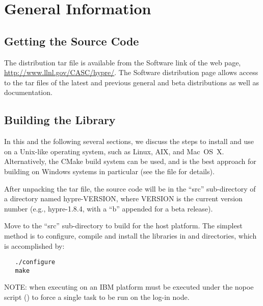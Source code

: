 
\chapter{General Information}


\section{Getting the Source Code}

The \hypre{} distribution tar file is available from the Software link of the
\hypre{} web page, \url{http://www.llnl.gov/CASC/hypre/}.  The \hypre{} Software
distribution page allows access to the tar files of the latest and previous
general and beta distributions as well as documentation.


\section{Building the Library}

In this and the following several sections, we discuss the steps to install and
use \hypre{} on a Unix-like operating system, such as Linux, AIX, and Mac~OS~X.
Alternatively, the CMake build system \cite{CMakeWebPage} can be used, and is
the best approach for building \hypre{} on Windows systems in particular (see
the  file for details).

After unpacking the \hypre{} tar file, the source code will be in the ``src''
sub-directory of a directory named hypre-VERSION, where VERSION is the current
version number (e.g., hypre-1.8.4, with a ``b'' appended for a beta release).

Move to the ``src'' sub-directory to build \hypre{} for the host platform.  The
simplest method is to configure, compile and install the libraries in
 and  directories, which is accomplished
by:
\begin{verbatim}
   ./configure
   make
\end{verbatim}

NOTE: when executing on an IBM platform  must be executed under
the nopoe script () to force a
single task to be run on the log-in node.

